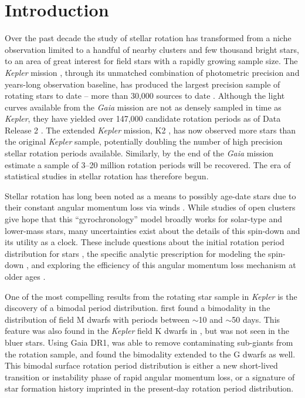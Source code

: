 \documentclass[preprint2]{aastex62}
\newcommand{\Kepler}{\textsl{Kepler}\xspace}
\begin{document}
\section{Introduction}
Over the past decade the study of stellar rotation has transformed from a niche observation limited to a handful of nearby clusters and few thousand bright stars, to an area of great  interest for field stars with a rapidly growing sample size.
The \Kepler mission \citep{borucki2010}, through its unmatched combination of photometric precision and years-long observation baseline, has produced the largest precision sample of rotating stars to date -- more than 30,000 sources to date \citep{mcquillan2014}. 
Although the light curves available from the {\em Gaia} mission are not as densely sampled in time as \Kepler \citep{gaia}, they have yielded over 147,000 candidate rotation periods as of Data Release 2 \citep{lanzafame2018}. 
The extended \Kepler mission, K2 \citep{howell2014}, has now observed more stars than the original \Kepler sample, potentially doubling the number of high precision stellar rotation periods available. 
Similarly, by the end of the {\em Gaia} mission \citet{lanzafame2018} estimate a sample of 3--20 million rotation periods will be recovered. The era of statistical studies in stellar rotation has therefore begun.

Stellar rotation has long been noted as a means to possibly age-date stars due to their constant angular momentum loss via winds \citep{skumanich1972}. 
While studies of open clusters give hope that this ``gyrochronology'' model broadly works for solar-type and lower-mass stars, many uncertainties exist about the details of this spin-down and its utility as a clock. These include questions about the initial rotation period distribution for stars \citep[e.g.][]{barnes2010,matt2015}, the specific analytic prescription for modeling the spin-down \citep{angus2015}, and exploring the efficiency of this angular momentum loss mechanism at older ages \citep{van-saders2016}.


One of the most compelling results from the rotating star sample in \Kepler is the discovery of a bimodal period distribution.
\citet{mcquillan2013} first found a bimodality in the distribution of field M dwarfs with periods between $\sim$10 and $\sim$50 days. This feature was also found in the \Kepler field K dwarfs in \citet{mcquillan2014}, but was not seen in the bluer stars. Using Gaia DR1, \citet{davenport2017} was able to remove contaminating sub-giants from the rotation sample, and found the bimodality extended to the G dwarfs as well. This bimodal surface rotation period distribution is either a new short-lived transition or instability phase of rapid angular momentum loss, or a signature of star formation history imprinted in the present-day rotation period distribution. 
\end{document}
